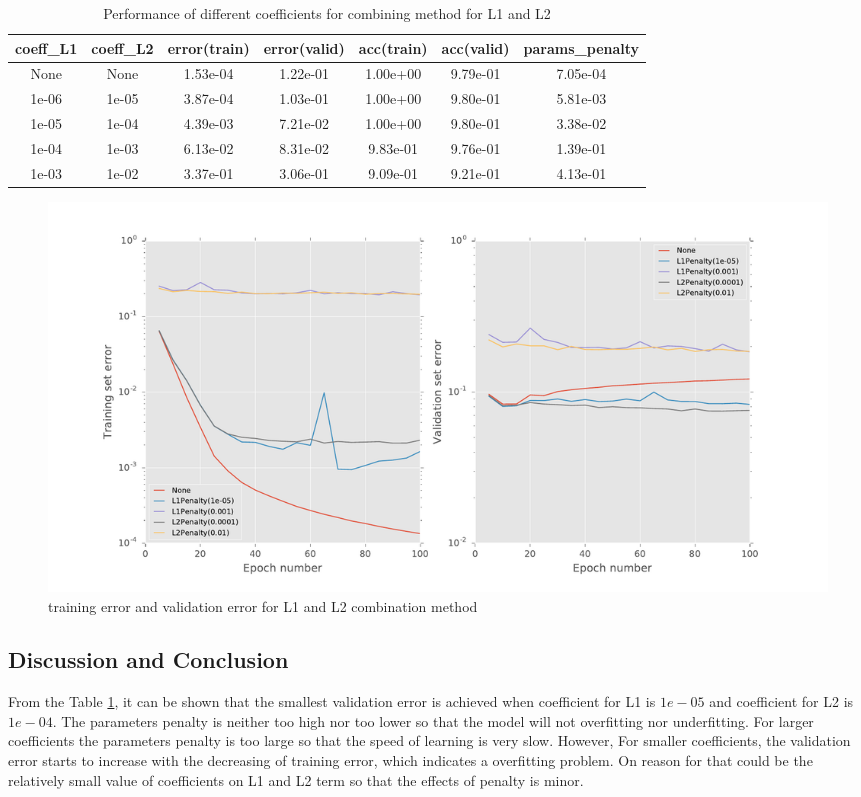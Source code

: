 \documentclass[11pt]{article}
\begin{document}
\begin{table}
\begin{center}
\begin{tabular}{ c  c c c c  c c} 
\hline
coeff\_L1 & coeff\_L2 &error(train) & error(valid) & acc(train) & acc(valid) & params\_penalty\\
\hline
\hline
None & None	&1.53e-04 & 1.22e-01 & 1.00e+00 & 9.79e-01 &7.05e-04\\ 
1e-06 & 1e-05  	&3.87e-04 & 1.03e-01 & 1.00e+00 & 9.80e-01 &5.81e-03\\ 
1e-05 &1e-04	 &4.39e-03 & 7.21e-02 & 1.00e+00 & 9.80e-01 &3.38e-02\\ 
1e-04 & 1e-03 & 6.13e-02  &  8.31e-02  &  9.83e-01 & 9.76e-01  &  1.39e-01\\
1e-03 & 1e-02 &3.37e-01&  3.06e-01   & 9.09e-01 & 9.21e-01 &4.13e-01\\
\end{tabular}
\caption{Performance of different coefficients for combining method for L1 and L2}
\label{tb:L1_L2_combine}
\end{center}	
\end{table}

\begin{figure}[h]
\centering 
  \includegraphics[width=1\textwidth]{baseline_L1_L2.pdf}
  \caption{training error and validation error for L1 and L2 combination method}
  \label{fg:L1_L2_combine}
\end{figure}

\subsection{Discussion and Conclusion}
From the Table \ref{tb:L1_L2_combine}, it can be shown that the smallest validation error is achieved when coefficient for L1 is $1e-05$ and coefficient for L2 is $1e-04$. The parameters penalty is neither too high nor too lower so that the model will not overfitting nor underfitting. For larger coefficients the parameters penalty is too large so that the speed of learning is very slow. However, For smaller coefficients, the validation error starts to increase with the decreasing of training error, which indicates a overfitting problem. On reason for that could be the relatively small value of coefficients on L1 and L2 term so that the effects of penalty is minor.
\end{document}
